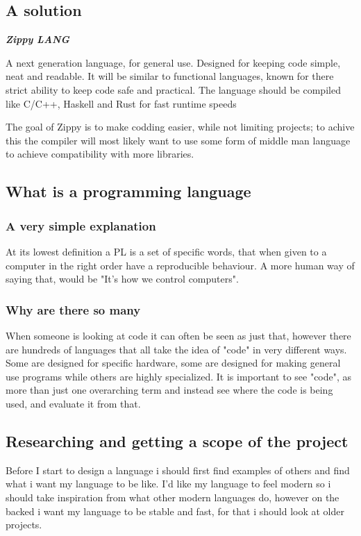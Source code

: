 \documentclass[a4paper,12pt]{article}
\begin{document}
{\subsection{A solution}

\textbf{\textit{Zippy LANG}}

A next generation language, for general use. Designed for keeping code simple,
neat and readable. It will be similar to functional languages, known for 
there strict ability to keep code safe and practical. The language should 
be compiled like C/C++, Haskell and Rust for fast runtime speeds

The goal of Zippy is to make codding easier, while not limiting projects; to 
achive this the compiler will most likely want to use some form of middle man
language to achieve compatibility with more libraries.

\subsection{What is a programming language}
\subsubsection{A very simple explanation}
At its lowest definition a PL is a set of specific words, that when given
to a computer in the right order have a reproducible behaviour. A more human 
way of saying that, would be "It's how we control computers".
\subsubsection{Why are there so many}
When someone is looking at code it can often be seen as just that, however
there are hundreds of languages that all take the idea of "code" in very 
different ways. Some are designed for specific hardware, some are designed 
for making general use programs while others are highly specialized.
It is important to see "code", as more than just one overarching term and
instead see where the code is being used, and evaluate it from that.

\subsection{Researching and getting a scope of the project}
Before I start to design a language i should first find examples of others
and find what i want my language to be like. I'd like my language to feel modern 
so i should take inspiration from what other modern languages do, however on the 
backed i want my language to be  stable and fast, for that i should look at 
older projects.

}
\end{document}
